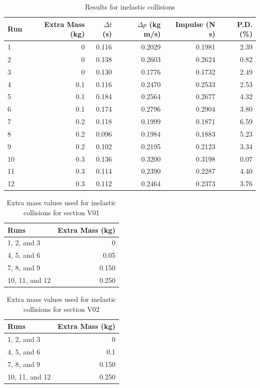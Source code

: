 %
\begin{table}[ht]
    \centering
    \begin{tabular}{l|r|r|r|r|r}
        \textbf{Run} & \textbf{Extra Mass} (kg) & $\Delta t$ (s) & $\Delta p$ (kg m/s) & \textbf{Impulse} (N s) & \textbf{P.D.} (\%) \\  
        \hline
        1 & 0 & 0.116 & 0.2029 & 0.1981 & 2.39 \\
        2 & 0 & 0.138 & 0.2603 & 0.2624 & 0.82 \\
        3 & 0 & 0.130 & 0.1776 & 0.1732 & 2.49 \\
        \hline
        4 & 0.1 & 0.116 & 0.2470 & 0.2533 & 2.53 \\
        5 & 0.1 & 0.184 & 0.2564 & 0.2677 & 4.32 \\
        6 & 0.1 & 0.174 & 0.2796 & 0.2904 & 3.80 \\
        \hline
        7 & 0.2 & 0.118 & 0.1999 & 0.1871 & 6.59 \\
        8 & 0.2 & 0.096 & 0.1984 & 0.1883 & 5.23 \\
        9 & 0.2 & 0.102 & 0.2195 & 0.2123 & 3.34 \\
        \hline
        10 & 0.3 & 0.136 & 0.3200 & 0.3198 & 0.07 \\
        11 & 0.3 & 0.114 & 0.2390 & 0.2287 & 4.40 \\
        12 & 0.3 & 0.112 & 0.2464 & 0.2373 & 3.76 \\
        \hline
    \end{tabular}
    \caption{Results for inelastic collisions}
    \label{table:08.results.inelastic}
\end{table}
%
\begin{table}[ht]
    \centering
    \begin{tabular}{l|r}
        \textbf{Runs} & \textbf{Extra Mass} (kg) \\
        \hline
        1, 2, and 3 & 0 \\
        4, 5, and 6 & 0.05 \\
        7, 8, and 9 & 0.150 \\
        10, 11, and 12 & 0.250 \\
        \hline
    \end{tabular}
    \caption{Extra mass values used for inelastic collisions for section V01}
    \label{table:08.inelastic.mass.v01}
\end{table}
%
\begin{table}[ht]
    \centering
    \begin{tabular}{l|r}
        \textbf{Runs} & \textbf{Extra Mass} (kg) \\
        \hline
        1, 2, and 3 & 0 \\
        4, 5, and 6 & 0.1 \\
        7, 8, and 9 & 0.150 \\
        10, 11, and 12 & 0.250 \\
        \hline
    \end{tabular}
    \caption{Extra mass values used for inelastic collisions for section V02}
    \label{table:08.inelastic.mass.v02}
\end{table}
%
\newpage
\FloatBarrier
